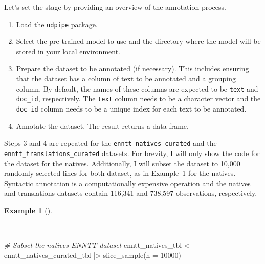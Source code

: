 \documentclass[
  letterpaper,
  DIV=11,
  numbers=noendperiod]{scrreport}
\newenvironment{Shaded}{\begin{snugshade}}{\end{snugshade}}
\newcommand{\AttributeTok}[1]{\textcolor[rgb]{0.00,0.00,0.00}{#1}}
\newcommand{\CommentTok}[1]{\textcolor[rgb]{0.00,0.00,0.00}{\textit{#1}}}
\newcommand{\DecValTok}[1]{\textcolor[rgb]{0.00,0.00,0.00}{#1}}
\newcommand{\FunctionTok}[1]{\textcolor[rgb]{0.00,0.00,0.00}{#1}}
\newcommand{\NormalTok}[1]{\textcolor[rgb]{0.00,0.00,0.00}{#1}}
\newcommand{\OtherTok}[1]{\textcolor[rgb]{0.00,0.00,0.00}{#1}}
\newcommand{\SpecialCharTok}[1]{\textcolor[rgb]{0.00,0.00,0.00}{#1}}
\providecommand{\tightlist}{%
  \setlength{\itemsep}{0pt}\setlength{\parskip}{0pt}}\usepackage{longtable,booktabs,array}
\theoremstyle{definition}
\newtheorem{example}{Example}[chapter]
\theoremstyle{remark}
\begin{document}
Let's set the stage by providing an overview of the annotation process.

\begin{enumerate}
\def\labelenumi{\arabic{enumi}.}
\tightlist
\item
  Load the \texttt{udpipe} package.
\item
  Select the pre-trained model to use and the directory where the model
  will be stored in your local environment.
\item
  Prepare the dataset to be annotated (if necessary). This includes
  ensuring that the dataset has a column of text to be annotated and a
  grouping column. By default, the names of these columns are expected
  to be \texttt{text} and \texttt{doc\_id}, respectively. The
  \texttt{text} column needs to be a character vector and the
  \texttt{doc\_id} column needs to be a unique index for each text to be
  annotated.
\item
  Annotate the dataset. The result returns a data frame.
\end{enumerate}

Steps 3 and 4 are repeated for the \texttt{enntt\_natives\_curated} and
the \texttt{enntt\_translations\_curated} datasets. For brevity, I will
only show the code for the dataset for the natives. Additionally, I will
subset the dataset to 10,000 randomly selected lines for both dataset,
as in Example~\ref{exm-td-generation-subset-natives} for the natives.
Syntactic annotation is a computationally expensive operation and the
natives and translations datasets contain 116,341 and 738,597
observations, respectively.

\begin{example}[]\protect\hypertarget{exm-td-generation-subset-natives}{}\label{exm-td-generation-subset-natives}

~

\begin{Shaded}
\begin{Highlighting}[]
\CommentTok{\# Subset the natives ENNTT dataset}
\NormalTok{enntt\_natives\_tbl }\OtherTok{\textless{}{-}} 
\NormalTok{  enntt\_natives\_curated\_tbl }\SpecialCharTok{|\textgreater{}} 
  \FunctionTok{slice\_sample}\NormalTok{(}\AttributeTok{n =} \DecValTok{10000}\NormalTok{)}
\end{Highlighting}
\end{Shaded}

\end{example}
\end{document}
